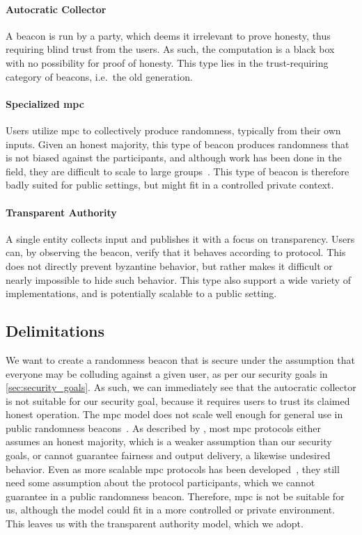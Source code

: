 \paragraph{Autocratic Collector}
A beacon is run by a party, which deems it irrelevant to prove honesty, thus requiring blind trust from the users.
As such, the computation is a black box with no possibility for proof of honesty.
This type lies in the trust-requiring category of beacons, i.e.\ the old generation.

\paragraph{Specialized \acrshort{mpc}}
Users utilize \acrfull{mpc} to collectively produce randomness, typically from their own inputs.
Given an honest majority, this type of beacon produces randomness that is not biased against the participants, and although work has been done in the field, they are difficult to scale to large groups~\cite{cascudo2017scrape, syta2017scalable}.
This type of beacon is therefore badly suited for public settings, but might fit in a controlled private context.

\paragraph{Transparent Authority}
A single entity collects input and publishes it with a focus on transparency.
Users can, by observing the beacon, verify that it behaves according to protocol.
This does not directly prevent byzantine behavior, but rather makes it difficult or nearly impossible to hide such behavior.
This type also support a wide variety of implementations, and is potentially scalable to a public setting.

\subsection{Delimitations}%
\label{sub:delimitations}
We want to create a randomness beacon that is secure under the assumption that everyone may be colluding against a given user, as per our security goals in \cref{sec:security_goals}.
As such, we can immediately see that the autocratic collector is not suitable for our security goal, because it requires users to trust its claimed honest operation.
The \gls{mpc} model does not scale well enough for general use in public randomness beacons~\cite{syta2017scalable}.
As described by \citet{damgaard2006scalable}, most \gls{mpc} protocols either assumes an honest majority, which is a weaker assumption than our security goals, or cannot guarantee fairness and output delivery, a likewise undesired behavior.
Even as more scalable \gls{mpc} protocols has been developed~\cite{damgaard2006scalable}, they still need some assumption about the protocol participants, which we cannot guarantee in a public randomness beacon.
Therefore, \gls{mpc} is not be suitable for us, although the model could fit in a more controlled or private environment.
This leaves us with the transparent authority model, which we adopt.

